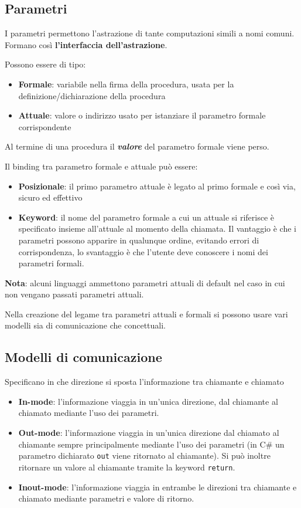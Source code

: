 \documentclass[12pt,a4paper]{article}
\begin{document}
\subsection{Parametri}
I parametri permettono l'astrazione di tante computazioni simili a nomi comuni. Formano così \textbf{l'interfaccia dell'astrazione}.

Possono essere di tipo:
\begin{itemize}
\item \textbf{Formale}: variabile nella firma della procedura, usata per la definizione\slash dichiarazione della procedura
\item \textbf{Attuale}: valore o indirizzo usato per istanziare il parametro formale corrispondente
\end{itemize}
Al termine di una procedura il \textbf{\textit{valore}} del parametro formale viene perso.

Il binding tra parametro formale e attuale può essere:
\begin{itemize}
\item \textbf{Posizionale}: il primo parametro attuale è legato al primo formale e così via, sicuro ed effettivo
\item \textbf{Keyword}: il nome del parametro formale a cui un attuale si riferisce è specificato insieme all'attuale al momento della chiamata. Il vantaggio è che i parametri possono apparire in qualunque ordine, evitando errori di corrispondenza, lo svantaggio è che l'utente deve conoscere i nomi dei parametri formali.
\end{itemize}

\textbf{Nota}: alcuni linguaggi ammettono parametri attuali di default nel caso in cui non vengano passati parametri attuali.

Nella creazione del legame tra parametri attuali e formali si possono usare vari modelli sia di comunicazione che concettuali.

\subsection{Modelli di comunicazione}
Specificano in che direzione si sposta l'informazione tra chiamante e chiamato
\begin{itemize}
\item \textbf{In-mode}: l'informazione viaggia in un'unica direzione, dal chiamante al chiamato mediante l'uso dei parametri.
\item \textbf{Out-mode}: l'informazione viaggia in un'unica direzione dal chiamato al chiamante sempre principalmente mediante l'uso dei parametri (in C\# un parametro dichiarato \texttt{out} viene ritornato al chiamante). Si può inoltre ritornare un valore al chiamante tramite la keyword \texttt{return}.
\item \textbf{Inout-mode}: l'informazione viaggia in entrambe le direzioni tra chiamante e chiamato mediante parametri e valore di ritorno.
\end{itemize}
\end{document}
